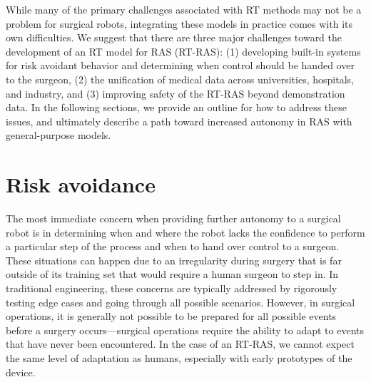 \documentclass[fleqn,10pt]{wlscirep}\twocolumn
\begin{document}


While many of the primary challenges associated with RT methods may not be a problem for surgical robots, integrating these models in practice comes with its own difficulties. %
We suggest that there are three major challenges toward the development of an RT model for RAS (RT-RAS): (1) developing built-in systems for risk avoidant behavior and determining when control should be handed over to the surgeon, (2) the unification of medical data across universities, hospitals, and industry, and (3) improving safety of the RT-RAS beyond demonstration data. 
In the following sections, we provide an outline for how to address these issues, and ultimately describe a path toward increased autonomy in RAS with general-purpose models.



\section*{Risk avoidance}

The most immediate concern when providing further autonomy to a surgical robot is in determining when and where the robot lacks the confidence to perform a particular step of the process and when to hand over control to a surgeon.
These situations can happen due to an irregularity during surgery that is far outside of its training set that would require a human surgeon to step in. 
In traditional engineering, these concerns are typically addressed by rigorously testing edge cases and going through all possible scenarios. 
However, in surgical operations, it is generally not possible to be prepared for all possible events before a surgery occurs---surgical operations require the ability to adapt to events that have never been encountered.
In the case of an RT-RAS, we cannot expect the same level of adaptation as humans, especially with early prototypes of the device.
\end{document}
